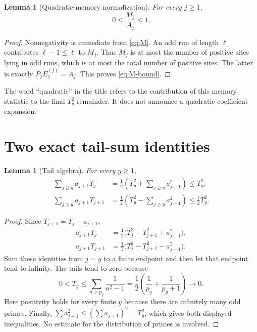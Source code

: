 \documentclass[11pt]{article}
\newtheorem{lemma}[theorem]{Lemma}
\theoremstyle{definition}
\theoremstyle{remark}
\begin{document}
\begin{lemma}[Quadratic-memory normalization]
\label{lem:M-bound}
For every $j\ge1$,
\begin{equation}
                         0\le\frac{M_j}{A_j}\le1.
 \label{eq:M-bound}
\end{equation}
\end{lemma}

\begin{proof}
Nonnegativity is immediate from \eqref{eq:M}.  An odd run of length
$\ell$ contributes $\ell-1\le\ell$ to $M_j$.  Thus $M_j$ is at most the
number of positive sites lying in odd runs, which is at most the total
number of positive sites.  The latter is exactly
$P_jE_1^{(j)}=A_j$.  This proves \eqref{eq:M-bound}.
\end{proof}

The word ``quadratic'' in the title refers to the contribution of this
memory statistic to the final $T_y^2$ remainder.  It does not announce a
quadratic coefficient expansion.

\section{Two exact tail-sum identities}

\begin{lemma}[Tail algebra]
\label{lem:tail-algebra}
For every $y\ge1$,
\begin{align}
 \sum_{j\ge y}a_{j+1}T_j
 &=\frac12\left(T_y^2+\sum_{j\ge y}a_{j+1}^2\right)
 \le T_y^2,
 \label{eq:tail-current}\\
 \sum_{j\ge y}a_{j+1}T_{j+1}
 &=\frac12\left(T_y^2-\sum_{j\ge y}a_{j+1}^2\right)
 \le\frac12T_y^2.
 \label{eq:tail-next}
\end{align}
\end{lemma}

\begin{proof}
Since $T_{j+1}=T_j-a_{j+1}$,
\begin{align*}
 a_{j+1}T_j
 &=\frac12\bigl(T_j^2-T_{j+1}^2+a_{j+1}^2\bigr),\\
 a_{j+1}T_{j+1}
 &=\frac12\bigl(T_j^2-T_{j+1}^2-a_{j+1}^2\bigr).
\end{align*}
Sum these identities from $j=y$ to a finite endpoint and then let that
endpoint tend to infinity.  The tails tend to zero because
\begin{equation}
 0<T_y\le\sum_{n>p_y}\frac1{n^2-1}
 =\frac12\left(\frac1{p_y}+\frac1{p_y+1}\right)\longrightarrow0.
 \label{eq:T-zero}
\end{equation}
Here positivity holds for every finite $y$ because there are infinitely
many odd primes.  Finally,
$\sum a_{j+1}^2\le(\sum a_{j+1})^2=T_y^2$, which gives both displayed
inequalities.  No estimate for the distribution of primes is involved.
\end{proof}
\end{document}
